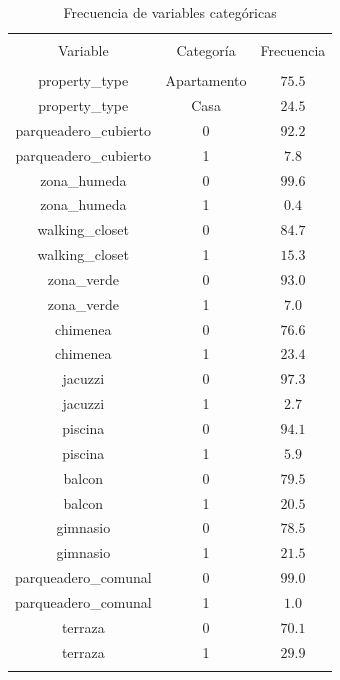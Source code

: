 
\begin{table}[!htbp] \centering 
  \caption{Frecuencia de variables categóricas} 
  \label{tab:frecuencias_categoricas} 
\begin{tabular}{@{\extracolsep{5pt}} ccc} 
\\[-1.8ex]\hline 
\hline \\[-1.8ex] 
Variable & Categoría & Frecuencia \\ 
\hline \\[-1.8ex] 
property\_type & Apartamento & $75.5$ \\ 
property\_type & Casa & $24.5$ \\ 
parqueadero\_cubierto & 0 & $92.2$ \\ 
parqueadero\_cubierto & 1 & $7.8$ \\ 
zona\_humeda & 0 & $99.6$ \\ 
zona\_humeda & 1 & $0.4$ \\ 
walking\_closet & 0 & $84.7$ \\ 
walking\_closet & 1 & $15.3$ \\ 
zona\_verde & 0 & $93.0$ \\ 
zona\_verde & 1 & $7.0$ \\ 
chimenea & 0 & $76.6$ \\ 
chimenea & 1 & $23.4$ \\ 
jacuzzi & 0 & $97.3$ \\ 
jacuzzi & 1 & $2.7$ \\ 
piscina & 0 & $94.1$ \\ 
piscina & 1 & $5.9$ \\ 
balcon & 0 & $79.5$ \\ 
balcon & 1 & $20.5$ \\ 
gimnasio & 0 & $78.5$ \\ 
gimnasio & 1 & $21.5$ \\ 
parqueadero\_comunal & 0 & $99.0$ \\ 
parqueadero\_comunal & 1 & $1.0$ \\ 
terraza & 0 & $70.1$ \\ 
terraza & 1 & $29.9$ \\ 
\hline \\[-1.8ex] 
\end{tabular} 
\end{table} 
